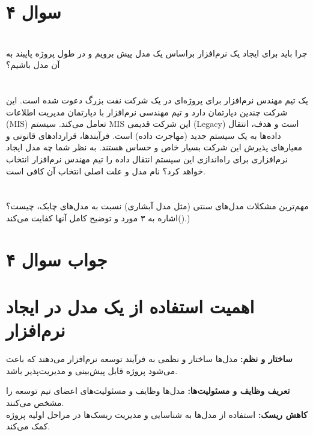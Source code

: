 \section*{سوال ۴}

\section*{}
 چرا باید برای ایجاد یک نرم‌افزار براساس یک مدل پیش برویم و در طول پروژه پایبند به آن مدل باشیم؟

\section*{}
یک تیم مهندس نرم‌افزار برای پروژه‌ای در یک شرکت نفت بزرگ دعوت شده است. این شرکت چندین دپارتمان دارد و تیم مهندسی نرم‌افزار با دپارتمان مدیریت اطلاعات (MIS) تعامل می‌کند. سیستم MIS این شرکت قدیمی (Legacy) است و هدف، انتقال داده‌ها به یک سیستم جدید (مهاجرت داده) است. فرآیندها، قراردادهای قانونی و معیارهای پذیرش این شرکت بسیار خاص و حساس هستند. به نظر شما چه مدل ایجاد نرم‌افزاری برای راه‌اندازی این سیستم انتقال داده را تیم مهندس نرم‌افزار انتخاب خواهد کرد؟ نام مدل و علت اصلی انتخاب آن کافی است.

\section*{}
مهم‌ترین مشکلات مدل‌های سنتی (مثل مدل آبشاری) نسبت به مدل‌های چابک، چیست؟ ()اشاره به ۳ مورد و توضیح کامل آنها کفایت می‌کند.)

\section*{جواب سوال ۴}

\section*{ اهمیت استفاده از یک مدل در ایجاد نرم‌افزار}
\textbf{ساختار و نظم:}
مدل‌ها ساختار و نظمی به فرآیند توسعه نرم‌افزار می‌دهند که باعث می‌شود پروژه قابل پیش‌بینی و مدیریت‌پذیر باشد.

\textbf{تعریف وظایف و مسئولیت‌ها:}
مدل‌ها وظایف و مسئولیت‌های اعضای تیم توسعه را مشخص می‌کنند. \\

\textbf{کاهش ریسک:}
استفاده از مدل‌ها به شناسایی و مدیریت ریسک‌ها در مراحل اولیه پروژه کمک می‌کند.


